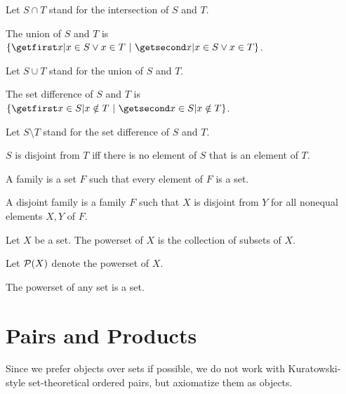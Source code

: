 \documentclass{article}
\begin{document}
\begin{forthel}
  Let $S \cap T$ stand for the intersection of $S$ and $T$.

  \begin{definition}
    The union of $S$ and $T$ is $\class{x | x \in S \vee x \in T}$.
  \end{definition}

  Let $S \cup T$ stand for the union of $S$ and $T$.

  \begin{definition}
    The set difference of $S$ and $T$ is $\class{x \in S | x \notin T}$.
  \end{definition}

  Let $S \setminus T$ stand for the set difference of $S$ and $T$.

  \begin{definition}
    $S$ is disjoint from $T$ iff there is no element of $S$ that is an element
    of $T$.
  \end{definition}

  \begin{definition}
    A family is a set $F$ such that every element of $F$ is a set.
  \end{definition}

  \begin{definition}
    A disjoint family is a family $F$ such that $X$ is disjoint from $Y$ for all
    nonequal elements $X, Y$ of $F$.
  \end{definition}

    \begin{definition*}
      Let $X$ be a set.
      The powerset of $X$ is the collection of subsets of $X$.
    \end{definition*}

Let $\mathcal{P}(X)$ denote the powerset of $X$.

    \begin{axiom*}
      The powerset of any set is a set.
    \end{axiom*}

\end{forthel}


\section{Pairs and Products}

Since we prefer objects over sets if possible, we do not work
with Kuratowski-style set-theoretical ordered pairs, but
axiomatize them as objects.
\end{document}
